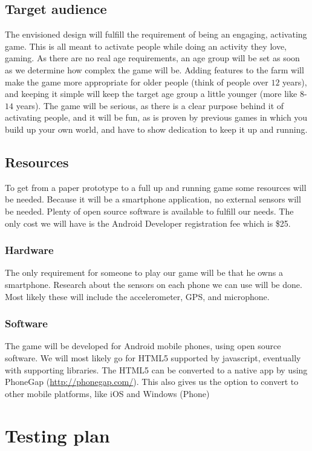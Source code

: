 \documentclass[a4paper,11pt,notitlepage]{report}
\begin{document}
\subsection{Target audience}
The envisioned design will fulfill the requirement of being an engaging, activating game. This is all meant to activate people while doing an activity they love, gaming. As there are no real age requirements, an age group will be set as soon as we determine how complex the game will be. Adding features to the farm will make the game more appropriate for older people (think of people over $12$ years), and keeping it simple will keep the target age group a little younger (more like $8$-$14$ years). The game will be serious, as there is a clear purpose behind it of activating people, and it will be fun, as is proven by previous games in which you build up your own world, and have to show dedication to keep it up and running.

\subsection{Resources}
To get from a paper prototype to a full up and running game some resources will be needed. Because it will be a smartphone application, no external sensors will be needed. Plenty of open source software is available to fulfill our needs. The only cost we will have is the Android Developer registration fee which is \$25.
\subsubsection{Hardware}
The only requirement for someone to play our game will be that he owns a smartphone. Research about the sensors on each phone we can use will be done. Most likely these will include the accelerometer, GPS, and microphone.
\subsubsection{Software}
The game will be developed for Android mobile phones, using open source software. 
We will most likely go for HTML5 supported by javascript, eventually with supporting libraries. The HTML5 can be converted to a native app by using PhoneGap (\url{http://phonegap.com/}). This also gives us the option to convert to other mobile platforms, like iOS and Windows (Phone)

\section{Testing plan}




%
%
\end{document}
